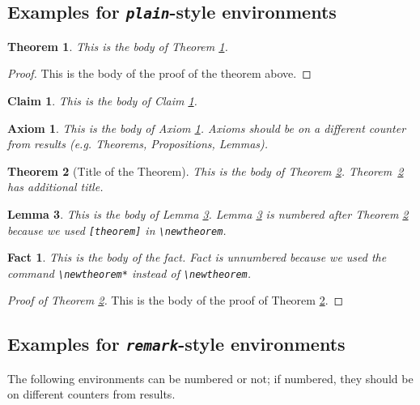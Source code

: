 \documentclass[qe,nameyear,draft]{econsocart}
\theoremstyle{plain}
\newtheorem{axiom}{Axiom}
\newtheorem{theorem}{Theorem}
\newtheorem{claim}{Claim}
\newtheorem{lemma}[theorem]{Lemma}
\newtheorem*{fact}{Fact}
\theoremstyle{remark}
\begin{document}
\subsection{Examples for \emph{\texttt{plain}}-style environments}

\begin{theorem}\label{th1}
This is the body of Theorem \ref{th1}.
\end{theorem}


\begin{proof}
This is the body of the proof of the theorem above.
\end{proof}

\begin{claim}\label{cl1}
This is the body of Claim \ref{cl1}. 
\end{claim}



\begin{axiom}\label{ax1}
This is the body of Axiom \ref{ax1}. Axioms should be on a different counter from results (e.g. Theorems, Propositions, Lemmas).
\end{axiom}

\begin{theorem}[Title of the Theorem]\label{th2}
This is the body of Theorem \ref{th2}. Theorem~\ref{th2} has additional title.
\end{theorem}

\begin{lemma}\label{le1}
This is the body of Lemma \ref{le1}. Lemma \ref{le1} is numbered after
Theorem \ref{th2} because we used \verb|[theorem]| in \verb|\newtheorem|.
\end{lemma}

\begin{fact}
This is the body of the fact. Fact is unnumbered because we used the command \verb|\newtheorem*|
instead of \verb|\newtheorem|.
\end{fact}

\begin{proof}[Proof of Theorem \ref{th2}]
This is the body of the proof of Theorem \ref{th2}.
\end{proof}


\subsection{Examples for \emph{\texttt{remark}}-style environments}

The following environments can be numbered or not; if numbered, they should be on different counters from results.
\end{document}
